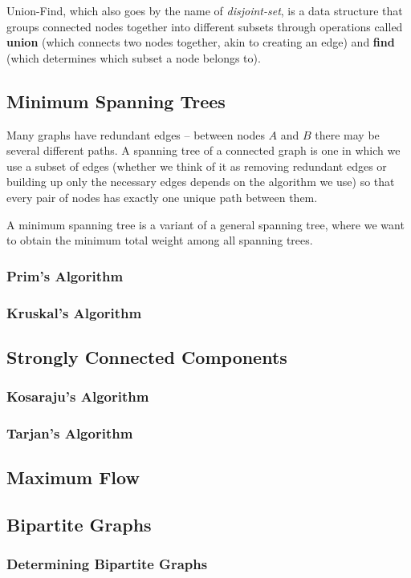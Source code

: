 Union-Find, which also goes by the name of \textit{disjoint-set}, is a data structure that groups connected nodes together into different subsets through operations called \textbf{union} (which connects two nodes together, akin to creating an edge) and \textbf{find} (which determines which subset a node belongs to).

\subsection{Minimum Spanning Trees}

Many graphs have redundant edges -- between nodes $A$ and $B$ there may be several different paths. A spanning tree of a connected graph is one in which we use a subset of edges (whether we think of it as removing redundant edges or building up only the necessary edges depends on the algorithm we use) so that every pair of nodes has exactly one unique path between them.

A minimum spanning tree is a variant of a general spanning tree, where we want to obtain the minimum total weight among all spanning trees.

\subsubsection{Prim's Algorithm}
\subsubsection{Kruskal's Algorithm}
\subsection{Strongly Connected Components}
\subsubsection{Kosaraju's Algorithm}
\subsubsection{Tarjan's Algorithm}
\subsection{Maximum Flow}
\subsection{Bipartite Graphs}
\subsubsection{Determining Bipartite Graphs}
